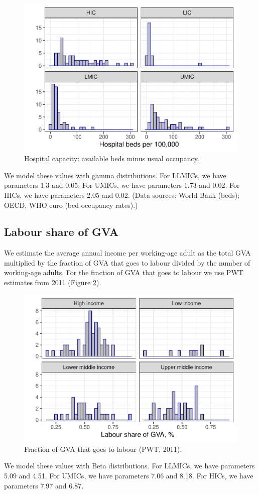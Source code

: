 \documentclass[
]{article}
\begin{document}
\begin{figure}
\includegraphics[width=0.5\linewidth]{README_files/figure-latex/hmax-1} \caption{Hospital capacity: available beds minus usual occupancy.}\label{fig:hmax}
\end{figure}

We model these values with gamma distributions. For LLMICs, we have parameters 1.3 and 0.05. For UMICs, we have parameters 1.73 and 0.02. For HICs, we have parameters 2.05 and 0.02. (Data sources: World Bank (beds); OECD, WHO euro (bed occupancy rates).)

\subsection{Labour share of GVA}\label{labour-share-of-gva}

We estimate the average annual income per working-age adult as the total GVA multiplied by the fraction of GVA that goes to labour divided by the number of working-age adults. For the fraction of GVA that goes to labour we use PWT estimates from 2011 (Figure \ref{fig:labsh}).

\begin{figure}
\includegraphics[width=0.5\linewidth]{README_files/figure-latex/labsh-1} \caption{Fraction of GVA that goes to labour (PWT, 2011).}\label{fig:labsh}
\end{figure}

We model these values with Beta distributions. For LLMICs, we have parameters 5.09 and 4.51. For UMICs, we have parameters 7.06 and 8.18. For HICs, we have parameters 7.97 and 6.87.
\end{document}

